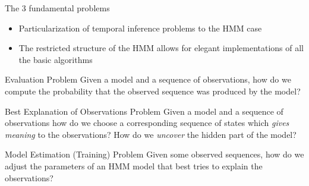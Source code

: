 \begin{frame}
  
  The 3 fundamental problems \citep{rabiner1989tutorial}
  \begin{itemize}
  	\item Particularization of temporal inference problems to the HMM case
  	\item The restricted structure of the HMM allows for elegant implementations of all the basic algorithms
  \end{itemize}
  \pause

  \begin{block}{Evaluation Problem}
    Given a model and a sequence of observations, how do we compute the probability that the \alert{observed 
    sequence} was produced by the model?
  \end{block}
  \pause
  \begin{block}{Best Explanation of Observations Problem}
    Given a model and a sequence of observations how do we choose a corresponding sequence of \alert{states} which 
    \emph{gives meaning} to the observations? How do we \emph{uncover} the hidden part of the model?
  \end{block}
  \pause
  \begin{block}{Model Estimation (Training) Problem}
    Given some observed sequences, how do we adjust the \alert{parameters} of an HMM model that best tries to explain 
    the observations? 
    
  \end{block}

\end{frame}